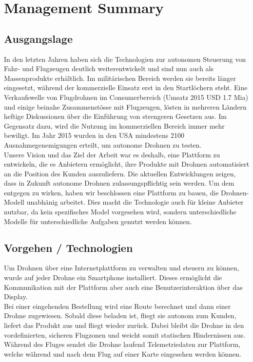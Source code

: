 \newpage
{}
\chapter*{Management Summary}
\section*{Ausgangslage}
In den letzten Jahren haben sich die Technologien zur autonomen Steuerung von Fahr- und Flugzeugen deutlich weiterentwickelt und sind nun auch als Massenprodukte erhältlich. Im militärischen Bereich werden sie bereits länger eingesetzt, während der kommerzielle Einsatz erst in den Startlöchern steht. Eine Verkaufswelle von Flugdrohnen im Consumerbereich (Umsatz 2015 USD 1.7 Mia) \cite{droneNZZ} und einige beinahe Zusammenstösse mit Flugzeugen, lösten in mehreren Ländern heftige Diskussionen über die Einführung von strengeren Gesetzen aus. Im Gegensatz dazu, wird die Nutzung im kommerziellen Bereich immer mehr bewiligt. Im Jahr 2015 wurden in den USA mindestens 2100 \cite{perm} Ausnahmegenemigungen erteilt, um autonome Drohnen zu testen.
\\
Unsere Vision und das Ziel der Arbeit war es deshalb, eine Plattform zu entwickeln, die es Anbietern ermöglicht, ihre Produkte mit Drohnen automatisiert an die Position des Kunden auszuliefern. Die aktuellen Entwicklungen zeigen, dass in Zukunft autonome Drohnen zulassungspflichtig sein werden. Um dem entgegen zu wirken, haben wir beschlossen eine Plattform zu bauen, die Drohnen-Modell unabhänig arbeitet. Dies macht die Technologie auch für kleine Anbieter nutzbar, da kein spezifisches Model vorgesehen wird, sondern unterschiedliche Modelle für unterschiedliche Aufgaben genutzt werden können.

\section*{Vorgehen / Technologien}
Um Drohnen über eine Internetplattform zu verwalten und steuern zu können, wurde auf jeder Drohne ein Smartphone installiert. Dieses ermöglicht die Kommunikation mit der Plattform aber auch eine Benutzerinteraktion über das Display.
\\
Bei einer eingehenden Bestellung wird eine Route berechnet und dann einer Drohne zugewiesen. Sobald diese beladen ist, fliegt sie autonom zum Kunden, liefert das Produkt aus und fliegt wieder zurück. Dabei bleibt die Drohne in den vordefinierten, sicheren Flugzonen und weicht somit statischen Hindernissen aus. Während des Fluges sendet die Drohne laufend Telemetriedaten zur Plattform, welche während und nach dem Flug auf einer Karte eingesehen werden können.

